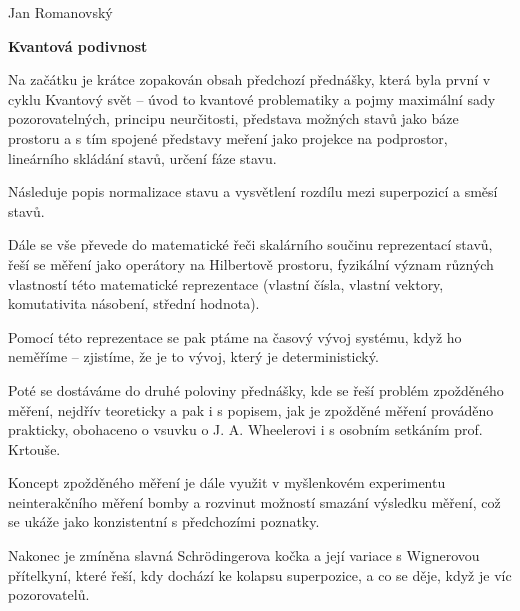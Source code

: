 \documentclass{article}
\begin{document}
\hfill Jan Romanovský
\begin{center}
    \textbf{Kvantová podivnost}
\end{center}

Na začátku je krátce zopakován obsah předchozí přednášky, která byla první v cyklu Kvantový svět -- úvod to kvantové problematiky a pojmy maximální sady pozorovatelných, principu neurčito\-sti, představa možných stavů jako báze prostoru a s tím spojené představy meření jako projekce na podprostor, lineárního skládání stavů, určení fáze stavu.

Následuje popis normalizace stavu a vysvětlení rozdílu mezi superpozicí a směsí stavů.

Dále se vše převede do matematické řeči skalárního součinu reprezentací stavů, řeší se měření jako operátory na Hilbertově prostoru, fyzikální význam různých vlastností této matematické reprezentace (vlastní čísla, vlastní vektory, komutativita násobení, střední hodnota).

Pomocí této reprezentace se pak ptáme na časový vývoj systému, když ho neměříme -- zjistíme, že je to  vývoj, který je deterministický.

Poté se dostáváme do druhé poloviny přednášky, kde se řeší problém zpožděného měření, nejdřív teoreticky a pak i s popisem, jak je zpožděné měření prováděno prakticky, obohaceno o vsuvku o J. A. Wheelerovi i s osobním setkáním prof. Krtouše.

Koncept zpožděného měření je dále využit v myšlenkovém experimentu neinterakčního měření bomby a rozvinut možností smazání výsledku měření, což se ukáže jako konzistentní s předchozími poznatky.

Nakonec je zmíněna slavná Schrödingerova kočka a její variace s Wignerovou přítelkyní, které řeší, kdy dochází ke kolapsu superpozice, a co se děje, když je víc pozorovatelů.
\end{document}
